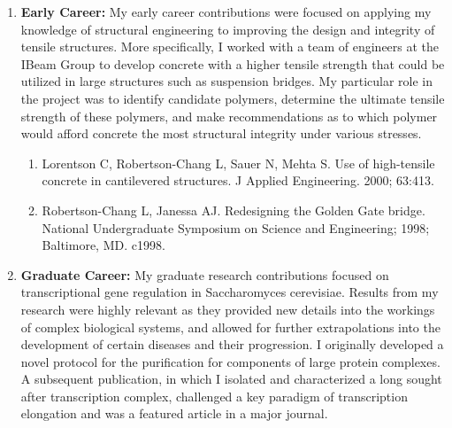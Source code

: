 \documentclass{nihbiosketch}
\begin{document}
\begin{enumerate}

\item
{\bfseries Early Career:}
My early career contributions were focused on applying my knowledge of structural engineering to improving the design and integrity of tensile structures. More specifically, I worked with a team of engineers at the IBeam Group to develop concrete with a higher tensile strength that could be utilized in large structures such as suspension bridges. My particular role in the project was to identify candidate polymers, determine the ultimate tensile strength of these polymers, and make recommendations as to which polymer would afford concrete the most structural integrity under various stresses.

\begin{enumerate}
\item
Lorentson C, Robertson-Chang L, Sauer N, Mehta S. Use of high-tensile concrete in cantilevered structures. J Applied Engineering. 2000; 63:413.
\item
Robertson-Chang L, Janessa AJ. Redesigning the Golden Gate bridge. National Undergraduate Symposium on Science and Engineering; 1998; Baltimore, MD. c1998.
\end{enumerate}

\item
{\bfseries Graduate Career:}
My graduate research contributions focused on transcriptional gene regulation in Saccharomyces cerevisiae. Results from my research were highly relevant as they provided new details into the workings of complex biological systems, and allowed for further extrapolations into the development of certain diseases and their progression. I originally developed a novel protocol for the purification for components of large protein complexes. A subsequent publication, in which I isolated and characterized a long sought after transcription complex, challenged a key paradigm of transcription elongation and was a featured article in a major journal.


\end{enumerate}
\end{document}

